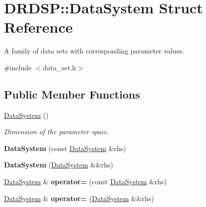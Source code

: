 \hypertarget{struct_d_r_d_s_p_1_1_data_system}{\section{D\-R\-D\-S\-P\-:\-:Data\-System Struct Reference}
\label{struct_d_r_d_s_p_1_1_data_system}
}


A family of data sets with corresponding parameter values.  




{\ttfamily \#include $<$data\-\_\-set.\-h$>$}

\subsection*{Public Member Functions}
\begin{DoxyCompactItemize}
\item 
\hypertarget{struct_d_r_d_s_p_1_1_data_system_ac69e5c3eea5a44af77e637de52e7bae4}{\hyperlink{struct_d_r_d_s_p_1_1_data_system_ac69e5c3eea5a44af77e637de52e7bae4}{Data\-System} ()}\label{struct_d_r_d_s_p_1_1_data_system_ac69e5c3eea5a44af77e637de52e7bae4}

\begin{DoxyCompactList}\small\item\em Dimension of the parameter space. \end{DoxyCompactList}\item 
\hypertarget{struct_d_r_d_s_p_1_1_data_system_a3932e5e343441907adbe5c88e9aa6c2f}{{\bfseries Data\-System} (const \hyperlink{struct_d_r_d_s_p_1_1_data_system}{Data\-System} \&rhs)}\label{struct_d_r_d_s_p_1_1_data_system_a3932e5e343441907adbe5c88e9aa6c2f}

\item 
\hypertarget{struct_d_r_d_s_p_1_1_data_system_afcb0f2f09041d9c5ce8ebf35babb0782}{{\bfseries Data\-System} (\hyperlink{struct_d_r_d_s_p_1_1_data_system}{Data\-System} \&\&rhs)}\label{struct_d_r_d_s_p_1_1_data_system_afcb0f2f09041d9c5ce8ebf35babb0782}

\item 
\hypertarget{struct_d_r_d_s_p_1_1_data_system_a5294fc0909f5346ea51016efa37b9fc5}{\hyperlink{struct_d_r_d_s_p_1_1_data_system}{Data\-System} \& {\bfseries operator=} (const \hyperlink{struct_d_r_d_s_p_1_1_data_system}{Data\-System} \&rhs)}\label{struct_d_r_d_s_p_1_1_data_system_a5294fc0909f5346ea51016efa37b9fc5}

\item 
\hypertarget{struct_d_r_d_s_p_1_1_data_system_aea74462f4d4dcabd599d85ec2db9a11d}{\hyperlink{struct_d_r_d_s_p_1_1_data_system}{Data\-System} \& {\bfseries operator=} (\hyperlink{struct_d_r_d_s_p_1_1_data_system}{Data\-System} \&\&rhs)}\label{struct_d_r_d_s_p_1_1_data_system_aea74462f4d4dcabd599d85ec2db9a11d}


\end{DoxyCompactItemize}
